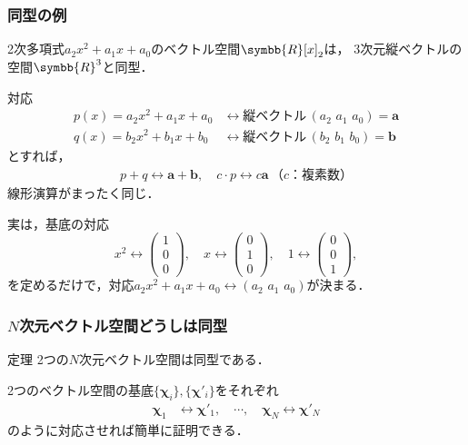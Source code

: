 \documentclass[
    10pt,
    ]{sotsu-beamer}
\begin{document}
\begin{frame}[allowframebreaks]
    \frametitle{同型の例}

    2次多項式$a_2 x^2 + a_1 x + a_0$のベクトル空間$\symbb{R}[x]_2$は，
    3次元縦ベクトルの空間$\symbb{R}^3$と同型．

    対応
    \begin{align*}
        p(x) = a_2 x^2 + a_1 x + a_0
        &\leftrightarrow \text{縦ベクトル} \, (a_2 \,\, a_1 \,\, a_0) = \symbf{a}
        \\
        q(x) = b_2 x^2 + b_1 x + b_0
        &\leftrightarrow \text{縦ベクトル} \, (b_2 \,\, b_1 \,\, b_0) = \symbf{b}
    \end{align*}
    とすれば，
    \begin{align*}
        p + q \leftrightarrow \symbf{a} + \symbf{b},
        \quad
        c \cdotp p \leftrightarrow c \symbf{a} \, \text{（$c$：複素数）}
    \end{align*}
    線形演算がまったく同じ．


    \framebreak

    実は，基底の対応
    \begin{equation*}
        x^2 \leftrightarrow \begin{pmatrix} 1 \\ 0 \\ 0 \end{pmatrix},
        \quad 
        x \leftrightarrow \begin{pmatrix} 0 \\ 1 \\ 0 \end{pmatrix},
        \quad 
        1 \leftrightarrow \begin{pmatrix} 0 \\ 0 \\ 1 \end{pmatrix},
    \end{equation*}
    を定めるだけで，対応$a_2 x^2 + a_1 x + a_0 \leftrightarrow (a_2 \,\, a_1 \,\, a_0)$が決まる．

\end{frame}


\begin{frame}
    \frametitle{$N$次元ベクトル空間どうしは同型}

    \begin{block}{定理}
        2つの$N$次元ベクトル空間は同型である．
    \end{block}

    2つのベクトル空間の基底$\{\symbf{\chi}_i\}, \{\symbf{\chi}'_i\}$をそれぞれ
    \begin{align*}
        \symbf{\chi}_1 &\leftrightarrow \symbf{\chi}'_1, 
        \quad
        \cdots, 
        \quad
        \symbf{\chi}_N \leftrightarrow \symbf{\chi}'_N
    \end{align*}
    のように対応させれば簡単に証明できる．

\end{frame}
\end{document}
